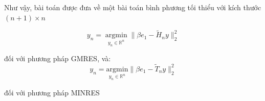 \documentclass[14pt, a4paper]{article}
\numberwithin{equation}{section}
\numberwithin{algorithm}{section}
\numberwithin{figure}{section}
\numberwithin{dl}{section}
\numberwithin{md}{section}
\numberwithin{bd}{section}
\begin{document}
Như vậy, bài toán được đưa về một bài toán bình phương tối thiểu với kích thước $(n+1)\times n$

\begin{equation}
    y_n = \operatorname*{argmin}_{y_n \in \mathbb{R}^{n}} \lVert \beta e_1 - \widetilde{H}_n y\rVert_2^2
\end{equation}

đối với phương pháp GMRES, và:
\begin{equation}
    y_n = \underset{y_n \in \mathbb{R}^{n}}{\mathrm{argmin}} \lVert \beta e_1 - \widetilde{T}_n y\rVert_2^2
\end{equation}

đối với phương pháp MINRES


\newpage
{}
%
%
\printbibliography[title={Tài liệu tham khảo}]

\end{document}
